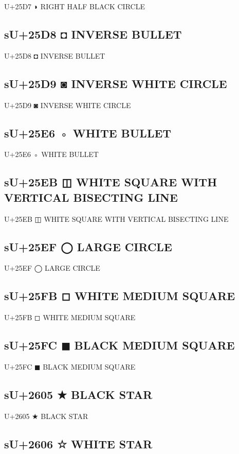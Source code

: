 U+25D7 ◗ RIGHT HALF BLACK CIRCLE

\subsection{sU+25D8 ◘ INVERSE BULLET}

U+25D8 ◘ INVERSE BULLET

\subsection{sU+25D9 ◙ INVERSE WHITE CIRCLE}

U+25D9 ◙ INVERSE WHITE CIRCLE

\subsection{sU+25E6 ◦  WHITE BULLET}

U+25E6 ◦  WHITE BULLET

\subsection{sU+25EB ◫ WHITE SQUARE WITH VERTICAL BISECTING LINE}

U+25EB ◫ WHITE SQUARE WITH VERTICAL BISECTING LINE

\subsection{sU+25EF ◯  LARGE CIRCLE}

U+25EF ◯  LARGE CIRCLE

\subsection{sU+25FB ◻ WHITE MEDIUM SQUARE}

U+25FB ◻ WHITE MEDIUM SQUARE

\subsection{sU+25FC ◼ BLACK MEDIUM SQUARE}

U+25FC ◼ BLACK MEDIUM SQUARE

\subsection{sU+2605 ★ BLACK STAR}

U+2605 ★ BLACK STAR

\subsection{sU+2606 ☆ WHITE STAR}

